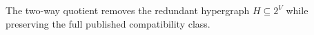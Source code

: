 The two-way quotient removes the redundant hypergraph \(H\subseteq2^V\) while preserving the full published compatibility class.